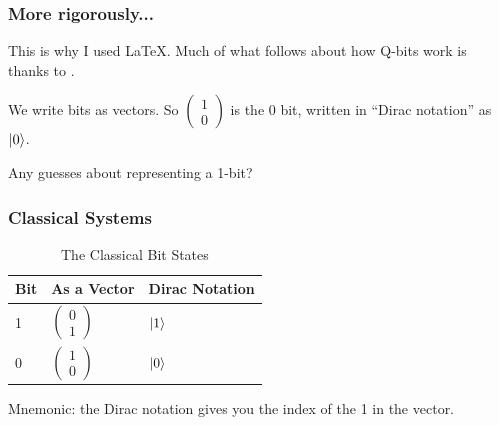 \documentclass{beamer}
\begin{document}
\begin{frame}
\frametitle{More rigorously...}

This is why I used \LaTeX.
Much of what follows about how Q-bits work is thanks to \cite{long-video}.

\begin{definition}
    We write bits as vectors. So $\begin{pmatrix}1 \\ 0\end{pmatrix}$ is the $0$ bit,
    written in ``Dirac notation'' as
    $\ket{0}$.
\end{definition}

Any guesses about representing a 1-bit?
\end{frame}

\begin{frame}
\frametitle{Classical Systems}
\begin{table}
\begin{tabular}{l l l}
\toprule
\textbf{Bit} & \textbf{As a Vector} & \textbf{Dirac Notation}\\
\midrule
1 & $\begin{pmatrix}0 \\ 1\end{pmatrix}$ & $\ket{1}$ \\
0 & $\begin{pmatrix}1 \\ 0\end{pmatrix}$ & $\ket{0}$ \\
\bottomrule
\end{tabular}
\caption{The Classical Bit States}
\end{table}

Mnemonic: the Dirac notation gives you the index of the 1 in the vector.
\end{frame}
\end{document}
